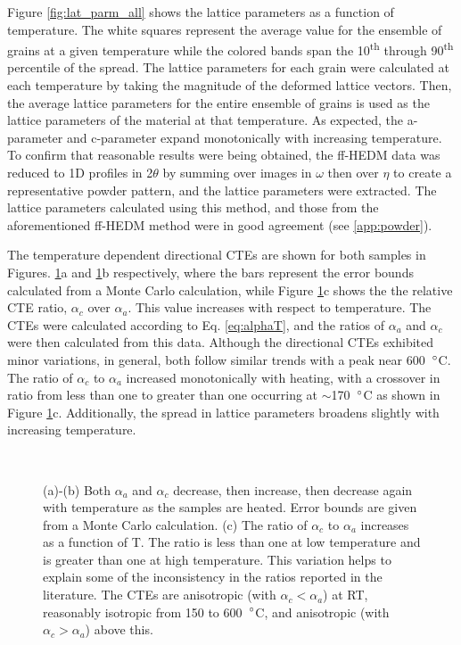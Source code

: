 \documentclass[3p]{elsarticle}
\begin{document}
	Figure \ref{fig:lat_parm_all} shows the lattice parameters as a function of temperature. The white squares represent the average value for the ensemble of grains at a given temperature while the colored bands span the 10\textsuperscript{th} through 90\textsuperscript{th} percentile of the spread. The lattice parameters for each grain were calculated at each temperature by taking the magnitude of the deformed lattice vectors. Then, the average lattice parameters for the entire ensemble of grains is used as the lattice parameters of the material at that temperature. As expected, the a-parameter and c-parameter expand monotonically with increasing temperature. To confirm that reasonable results were being obtained, the f{}f-HEDM data was reduced to 1D profiles in 2$\theta$ by summing over images in $\omega$ then over $\eta$ to create a representative powder pattern, and the lattice parameters were extracted. The lattice parameters calculated using this method, and those from the aforementioned f{}f-HEDM method were in good agreement (see \ref{app:powder}).



	
	The temperature dependent directional CTEs are shown for both samples in Figures. \ref{fig:CTEs}a and \ref{fig:CTEs}b respectively, where the bars represent the error bounds calculated from a Monte Carlo calculation, while Figure \ref{fig:CTEs}c shows the the relative CTE ratio, $\alpha_c$ over $\alpha_a$. This value increases with respect to temperature. The CTEs were calculated according to Eq. \ref{eq:alphaT}, and the ratios of $\alpha_a$ and $\alpha_c$ were then calculated from this data. Although the directional CTEs exhibited minor variations, in general, both follow similar trends with a peak near 600~$\degree$C. The ratio of $\alpha_c$ to $\alpha_a$ increased monotonically with heating, with a crossover in ratio from less than one to greater than one occurring at $\sim$170~$\degree$C as shown in Figure \ref{fig:CTEs}c. Additionally, the spread in lattice parameters broadens slightly with increasing temperature.
	
	\begin{figure}[b!]
		\centering
		\hspace{5pt}
		\\
		\caption{(a)-(b) Both $\alpha_a$ and $\alpha_c$ decrease, then increase, then decrease again with temperature as the samples are heated. Error bounds are given from a Monte Carlo calculation. (c) The ratio of $\alpha_c$ to $\alpha_a$ increases as a function of T. The ratio is less than one at low temperature and is greater than one at high temperature. This variation helps to explain some of the inconsistency in the ratios reported in the literature. The CTEs are anisotropic (with $\alpha_c < \alpha_a$) at RT, reasonably isotropic from 150 to 600~$\degree$C, and anisotropic (with $\alpha_c > \alpha_a$) above this.}
		\label{fig:CTEs}
	\end{figure}
\end{document}
